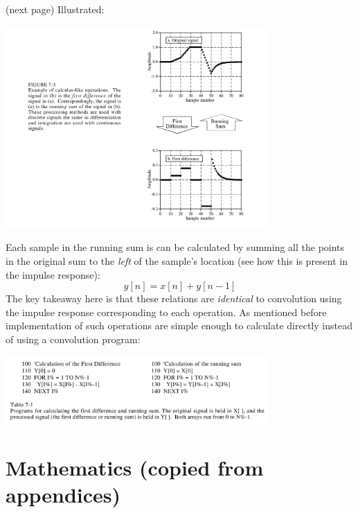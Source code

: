 \documentclass{report}
\begin{document}
(next page)\newpage
\noindent Illustrated:
\begin{center}
\includegraphics[width=10cm]{a11}\\
\end{center}
Each sample in the running sum is can be calculated by summing all the points in the original sum to the 
\textit{left} of the sample's location (see how this is present in the impulse response):
\begin{equation*}
y[n]=x[n]+y[n-1]
\end{equation*}
The key takeaway here is that these relations are \textit{identical} to convolution using the impulse response 
corresponding to each operation. As mentioned before 
implementation of such operations are simple enough to calculate directly instead of using a convolution program:
\begin{center}
\includegraphics[width=10cm]{a12}\\
\end{center}
\newpage

\subsection{}












\newpage
\appendix
\chapter{Mathematics (copied from appendices)}
\end{document}
